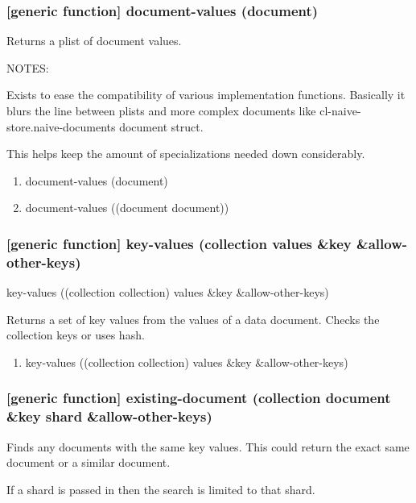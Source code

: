 \documentclass[11pt]{article}
\begin{document}
\subsubsection{[generic function] document-values (document)}
\label{sec:orgb02ee69}

Returns a plist of document values.

NOTES:

Exists to ease the compatibility of various implementation
functions. Basically it blurs the line between plists and more complex
documents like cl-naive-store.naive-documents document struct.

This helps keep the amount of specializations needed down
considerably.

\begin{enumerate}
\item document-values (document)
\label{sec:org0053509}

\item document-values ((document document))
\label{sec:org5120cf5}
\end{enumerate}

\subsubsection{[generic function] key-values (collection values \&key \&allow-other-keys)}
\label{sec:org3483875}

key-values ((collection collection) values \&key \&allow-other-keys)

Returns a set of key values from the values of a data document. Checks
the collection keys or uses hash.

\begin{enumerate}
\item key-values ((collection collection) values \&key \&allow-other-keys)
\label{sec:org3975d00}
\end{enumerate}

\subsubsection{[generic function] existing-document (collection document \&key shard \&allow-other-keys)}
\label{sec:orge8cd654}

Finds any documents with the same key values. This could return the
exact same document or a similar document.

If a shard is passed in then the search is limited to that shard.
\end{document}
